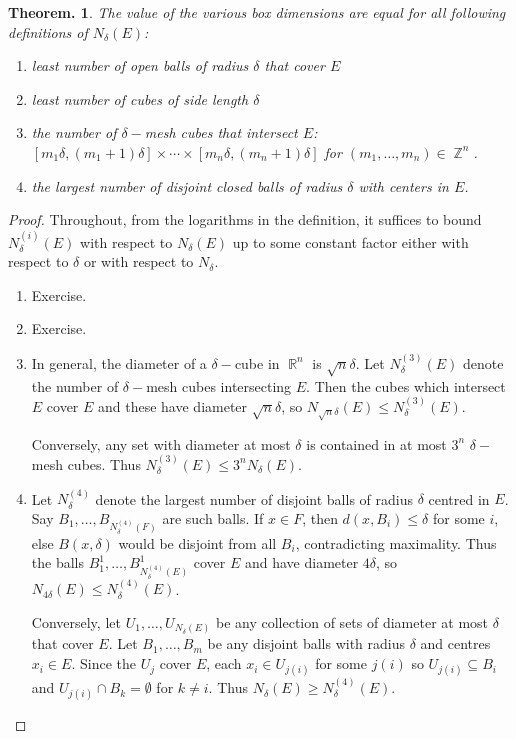 \documentclass[11pt, a4paper]{memoir}
\DeclareMathOperator{\Z}{{\mathbb{Z}}}
\DeclareMathOperator{\R}{{\mathbb{R}}}
\theoremstyle{change}
\newtheorem{theorem}{Theorem.}[section]
\theoremstyle{plain}
\theoremstyle{nonumberplain}
\newtheorem{proof}{Proof}
\numberwithin{equation}{section}
\begin{document}
\begin{theorem}
    The value of the various box dimensions are equal for all following definitions of $N_\delta(E)$:
    \begin{enumerate}[nl]
        \item least number of open balls of radius $\delta$ that cover $E$
        \item least number of cubes of side length $\delta$
        \item the number of $\delta-$mesh cubes that intersect $E$: $[m_1\delta,(m_1+1)\delta]\times\cdots\times[m_n\delta,(m_n+1)\delta]$ for $(m_1,\ldots,m_n)\in\Z^n$.
        \item the largest number of disjoint closed balls of radius $\delta$ with centers in $E$.
    \end{enumerate}
\end{theorem}
\begin{proof}
    Throughout, from the logarithms in the definition, it suffices to bound $N_\delta^{(i)}(E)$ with respect to $N_\delta(E)$ up to some constant factor either with respect to $\delta$ or with respect to $N_\delta$.
    \begin{enumerate}[nl]
        \item Exercise.
        \item Exercise.
        \item In general, the diameter of a $\delta-$cube in $\R^n$ is $\sqrt{n}\delta$.
            Let $N_\delta^{(3)}(E)$ denote the number of $\delta-$mesh cubes intersecting $E$.
            Then the cubes which intersect $E$ cover $E$ and these have diameter $\sqrt{n}\delta$, so $N_{\sqrt{n}\delta}(E)\leq N_\delta^{(3)}(E)$.

            Conversely, any set with diameter at most $\delta$ is contained in at most $3^n$ $\delta-$mesh cubes.
            Thus $N_\delta^{(3)}(E)\leq 3^nN_\delta(E)$.
        \item Let $N_\delta^{(4)}$ denote the largest number of disjoint balls of radius $\delta$ centred in $E$.
            Say $B_1,\ldots,B_{N_\delta^{(4)}(F)}$ are such balls.
            If $x\in F$, then $d(x,B_i)\leq\delta$ for some $i$, else $B(x,\delta)$ would be disjoint from all $B_i$, contradicting maximality.
            Thus the balls $B^1_1,\ldots,B^1_{N_\delta^{(4)}(E)}$ cover $E$ and have diameter $4\delta$, so $N_{4\delta}(E)\leq N_\delta^{(4)}(E)$.

            Conversely, let $U_1,\ldots,U_{N_\delta(E)}$ be any collection of sets of diameter at most $\delta$ that cover $E$.
            Let $B_1,\ldots,B_m$ be any disjoint balls with radius $\delta$ and centres $x_i\in E$.
            Since the $U_j$ cover $E$, each $x_i\in U_{j(i)}$ for some $j(i)$ so $U_{j(i)}\subseteq B_i$ and $U_{j(i)}\cap B_k=\emptyset$ for $k\neq i$.
            Thus $N_\delta(E)\geq N_\delta^{(4)}(E)$.
    \end{enumerate}
\end{proof}
\end{document}
